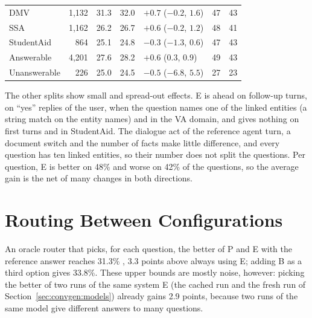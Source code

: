 \begin{table}[ht]
\begin{tabular}{lrrrlrr}
        DMV                                         & 1{,}132 & 31.3 & 32.0 & $+0.7$ ($-0.2$, $1.6$)  & 47 & 43 \\
        SSA                                         & 1{,}162 & 26.2 & 26.7 & $+0.6$ ($-0.2$, $1.2$)  & 48 & 41 \\
        StudentAid                                  &     864 & 25.1 & 24.8 & $-0.3$ ($-1.3$, $0.6$)  & 47 & 43 \\
        \midrule
        Answerable                                  & 4{,}201 & 27.6 & 28.2 & $+0.6$ ($0.3$, $0.9$)   & 49 & 43 \\
        Unanswerable                                &     226 & 25.0 & 24.5 & $-0.5$ ($-6.8$, $5.5$)  & 27 & 23 \\
        \bottomrule
    \end{tabular}
\end{table}

The other splits show small and spread-out effects. E is ahead on follow-up turns, on
``yes'' replies of the user, when the question names one of the linked entities (a
string match on the entity names) and in the VA domain, and gives nothing on first turns
and in StudentAid. The dialogue act of the reference agent turn, a document switch and the
number of facts make little difference, and every question has ten linked entities, so
their number does not split the questions. Per question, E is better on 48\% and worse on
42\% of the questions, so the average gain is the net of many changes in both directions.


\section{Routing Between Configurations}\label{sec:graphhelp:router}

An oracle router that picks, for each question, the better of P and E with the reference
answer reaches 31.3\% \fone{}, 3.3 points above always using E; adding B as a third
option gives 33.8\%. These upper bounds are mostly noise, however: picking the better of
two runs of the same system E (the cached run and the fresh run of
Section~\ref{sec:convgen:models}) already gains 2.9 points, because two runs of the same
model give different answers to many questions.

